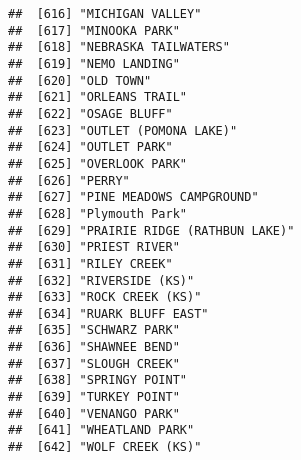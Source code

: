\documentclass[
]{article}
\begin{document}
\begin{verbatim}
##  [616] "MICHIGAN VALLEY"                                                                     
##  [617] "MINOOKA PARK"                                                                        
##  [618] "NEBRASKA TAILWATERS"                                                                 
##  [619] "NEMO LANDING"                                                                        
##  [620] "OLD TOWN"                                                                            
##  [621] "ORLEANS TRAIL"                                                                       
##  [622] "OSAGE BLUFF"                                                                         
##  [623] "OUTLET (POMONA LAKE)"                                                                
##  [624] "OUTLET PARK"                                                                         
##  [625] "OVERLOOK PARK"                                                                       
##  [626] "PERRY"                                                                               
##  [627] "PINE MEADOWS CAMPGROUND"                                                             
##  [628] "Plymouth Park"                                                                       
##  [629] "PRAIRIE RIDGE (RATHBUN LAKE)"                                                        
##  [630] "PRIEST RIVER"                                                                        
##  [631] "RILEY CREEK"                                                                         
##  [632] "RIVERSIDE (KS)"                                                                      
##  [633] "ROCK CREEK (KS)"                                                                     
##  [634] "RUARK BLUFF EAST"                                                                    
##  [635] "SCHWARZ PARK"                                                                        
##  [636] "SHAWNEE BEND"                                                                        
##  [637] "SLOUGH CREEK"                                                                        
##  [638] "SPRINGY POINT"                                                                       
##  [639] "TURKEY POINT"                                                                        
##  [640] "VENANGO PARK"                                                                        
##  [641] "WHEATLAND PARK"                                                                      
##  [642] "WOLF CREEK (KS)"                                                                     

\end{verbatim}
\end{document}
